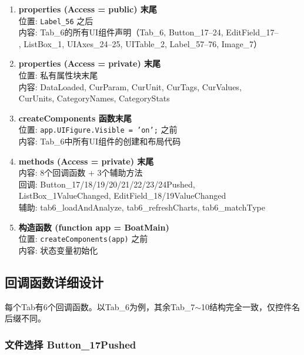 \documentclass[12pt,a3paper]{ctexart}
\begin{document}
\begin{enumerate}[label=\textbf{位置\arabic*:}]

    \item \textbf{properties (Access = public) 末尾}\\
    位置: \texttt{Label\_56} 之后\\
    内容: Tab\_6的所有UI组件声明（Tab\_6, Button\_17--24, EditField\_17--\\
    , ListBox\_1, UIAxes\_24--25, UITable\_2, Label\_57--76, Image\_7）

    \item \textbf{properties (Access = private) 末尾}\\
    位置: 私有属性块末尾\\
    内容: DataLoaded, CurParam, CurUnit, CurTags, CurValues,\\
    \quad CurUnits, CategoryNames, CategoryStats

    \item \textbf{createComponents 函数末尾}\\
    位置: \texttt{app.UIFigure.Visible = 'on';} 之前\\
    内容: Tab\_6中所有UI组件的创建和布局代码

    \item \textbf{methods (Access = private) 末尾}\\
    内容: 8个回调函数 + 3个辅助方法\\
    \quad 回调: Button\_17/18/19/20/21/22/23/24Pushed,\\
    \quad\qquad ListBox\_1ValueChanged, EditField\_18/19ValueChanged\\
    \quad 辅助: tab6\_loadAndAnalyze, tab6\_refreshCharts, tab6\_matchType

    \item \textbf{构造函数 (function app = BoatMain)}\\
    位置: \texttt{createComponents(app)} 之前\\
    内容: 状态变量初始化

\end{enumerate}

\subsection{回调函数详细设计}

每个Tab有6个回调函数。以Tab\_6为例，其余Tab\_7$\sim$10结构完全一致，仅控件名后缀不同。

\subsubsection{文件选择 Button\_17Pushed}
\end{document}
